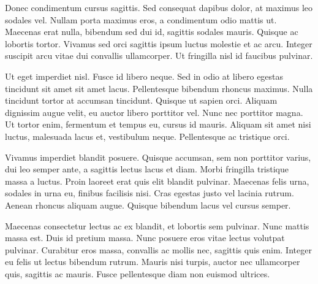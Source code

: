 Donec condimentum cursus sagittis. Sed consequat dapibus dolor, at maximus leo sodales vel. Nullam porta maximus eros, a condimentum odio mattis ut. Maecenas erat nulla, bibendum sed dui id, sagittis sodales mauris. Quisque ac lobortis tortor. Vivamus sed orci sagittis ipsum luctus molestie et ac arcu. Integer suscipit arcu vitae dui convallis ullamcorper. Ut fringilla nisl id faucibus pulvinar.

Ut eget imperdiet nisl. Fusce id libero neque. Sed in odio at libero egestas tincidunt sit amet sit amet lacus. Pellentesque bibendum rhoncus maximus. Nulla tincidunt tortor at accumsan tincidunt. Quisque ut sapien orci. Aliquam dignissim augue velit, eu auctor libero porttitor vel. Nunc nec porttitor magna. Ut tortor enim, fermentum et tempus eu, cursus id mauris. Aliquam sit amet nisi luctus, malesuada lacus et, vestibulum neque. Pellentesque ac tristique orci.

Vivamus imperdiet blandit posuere. Quisque accumsan, sem non porttitor varius, dui leo semper ante, a sagittis lectus lacus et diam. Morbi fringilla tristique massa a luctus. Proin laoreet erat quis elit blandit pulvinar. Maecenas felis urna, sodales in urna eu, finibus facilisis nisi. Cras egestas justo vel lacinia rutrum. Aenean rhoncus aliquam augue. Quisque bibendum lacus vel cursus semper.

Maecenas consectetur lectus ac ex blandit, et lobortis sem pulvinar. Nunc mattis massa est. Duis id pretium massa. Nunc posuere eros vitae lectus volutpat pulvinar. Curabitur eros massa, convallis ac mollis nec, sagittis quis enim. Integer eu felis ut lectus bibendum rutrum. Mauris nisi turpis, auctor nec ullamcorper quis, sagittis ac mauris. Fusce pellentesque diam non euismod ultrices.